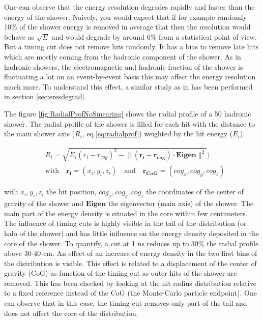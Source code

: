 One can observe that the energy resolution degrades rapidly and faster than the energy of the shower. Naively, you would expect that if for example randomly 10\% of the shower energy is removed in average that then the resolution would behave as $\sqrt{E}$ and would degrade by around 6\% from a statistical point of view. But a timing cut does not remove hits randomly. It has a bias to remove late hits which are mostly coming from the hadronic component of the shower. As in hadronic showers, the electromagnetic and hadronic fraction of the shower is fluctuating a lot on an event-by-event basis this may affect the energy resolution much more. To understand this effect, a similar study as in \cite{SoftCompNew2012} has been performed in section \ref{sec:eresdegrad}.

The figure \ref{fig:RadialProfNoSmearing} shows the radial profile of a 50 \GeV hadronic shower. The radial profile of the shower is filled for each hit with the distance to the main shower axis ($R_{i}$, eq.\ref{eq:radialprof})  weighted by the hit energy ($E_{i}$).

\begin{equation} \label{eq:radialprof}
  \begin{split}
    & R_{i} = \sqrt{\Sigma_{i} (r_{i} - r_{cog})^{2} - \lVert (\mathbf{r_{i}} - \mathbf{r_{cog}}) \cdot \mathbf{Eigen} \rVert^{2}}) \\
    & \text{with} \quad \mathbf{r_{i}} = (x_i, y_i, z_i) \quad \text{and} \quad \mathbf{r_{CoG}} = (cog_x, cog_y, cog_z)
  \end{split}
\end{equation}

with $x_i, y_i, z_i$ the hit position, $cog_x, cog_y, cog_z$ the coordinates of the center of gravity of the shower and $\mathbf{Eigen}$ the eigenvector (main axis) of the shower. The main part of the energy density is situated in the core within few centimeters. The influence of timing cuts is highly visible in the tail of the distribution (or halo of the shower) and has little influence on the energy density deposited in the core of the shower. To quantify, a cut at 1 ns reduces up to 30\% the radial profile above 30-40 cm. An effect of an increase of energy density in the two first bins of the distribution is visible. This effect is related to a displacement of the center of gravity (CoG) as function of the timing cut as outer hits of the shower are removed. This has been checked by looking at the hit radius distribution relative to a fixed reference instead of the CoG (the Monte-Carlo particle endpoint). One can observe that in this case, the timing cut removes only part of the tail and does not affect the core of the distribution.

